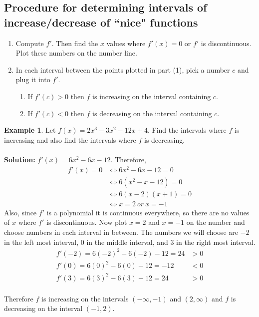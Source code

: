 \documentclass[reqno,psamsfonts]{amsart}
\theoremstyle{definition}
\newtheorem{exmp}[thm]{Example}
\theoremstyle{remark}
\numberwithin{equation}{section}
\begin{document}
\subsection*{Procedure for determining intervals of increase/decrease of ``nice" functions}
\begin{enumerate}
\item Compute $f'$. Then find the $x$ values where $f'(x) = 0$ or $f'$ is discontinuous. Plot these numbers on the number line. 
\\
\item In each interval between the points plotted in part (1), pick a number $c$ and plug it into $f'$. 
\begin{enumerate}
\item If $f'(c)>0$ then $f$ is increasing on the interval containing $c$. 
\item If $f'(c)<0$ then $f$ is decreasing on the interval containing $c$. 
\end{enumerate}

\end{enumerate}
\vspace{1em}
\begin{exmp}
Let $f(x) = 2x^3-3x^2-12x+4$. Find the intervals where $f$ is increasing and also find the intervals where $f$ is decreasing.
\\
\\\textbf{Solution:} $f'(x) = 6x^2-6x-12$. Therefore, 
\begin{align*}
f'(x)=0&\iff 6x^2-6x-12=0\\
&\iff 6(x^2-x-12)=0\\
&\iff 6(x-2)(x+1)=0\\
&\iff x=2\ or\ x=-1
\end{align*}
Also, since $f'$ is a polynomial it is continuous everywhere, so there are no values of $x$ where $f'$ is discontinuous. Now plot $x=2$ and $x=-1$ on the number and choose numbers in each interval in between. The numbers we will choose are $-2$ in the left most interval, $0$ in the middle interval, and $3$ in the right most interval. 
\begin{align*}
f'(-2)=6(-2)^2-6(-2)-12=24&>0\\
f'(0)=6(0)^2-6(0)-12=-12&<0\\
f'(3)=6(3)^2-6(3)-12=24&>0
\\
\end{align*}
\begin{center}
\end{center}
Therefore $f$ is increasing on the intervals $(-\infty, -1)$ and $(2,\infty)$ and $f$ is decreasing on the interval $(-1,2)$. 
\end{exmp}
\end{document}

